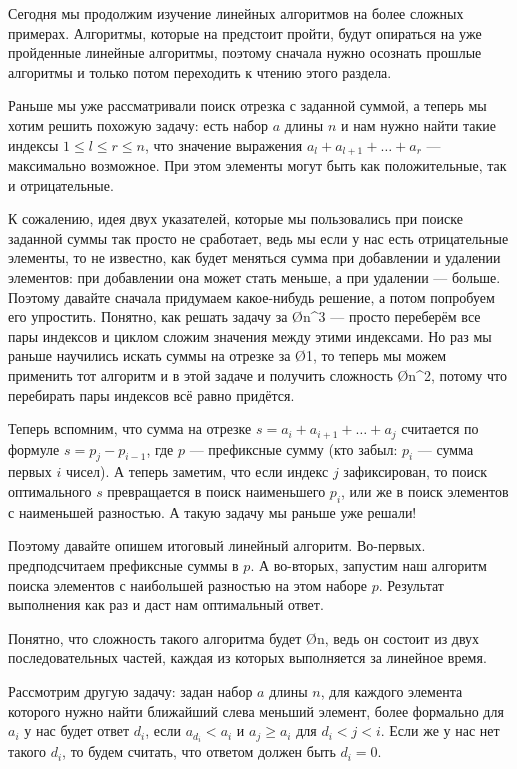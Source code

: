 Сегодня мы продолжим изучение линейных алгоритмов на более сложных примерах. Алгоритмы, которые на предстоит пройти, будут опираться на уже пройденные линейные алгоритмы, поэтому сначала нужно осознать прошлые алгоритмы и только потом переходить к чтению этого раздела.


Раньше мы уже рассматривали поиск отрезка с заданной суммой, а теперь мы хотим решить похожую задачу: есть набор $a$ длины $n$ и нам нужно найти такие индексы $1 \leq l \leq r \leq n$, что значение выражения $a_l + a_{l + 1} + \ldots + a_r$ — максимально возможное. При этом элементы могут быть как положительные, так и отрицательные. 

К сожалению, идея двух указателей, которые мы пользовались при поиске заданной суммы так просто не сработает, ведь мы если у нас есть отрицательные элементы, то не известно, как будет меняться сумма при добавлении и удалении элементов: при добавлении она может стать меньше, а при удалении — больше. Поэтому давайте сначала придумаем какое-нибудь решение, а потом попробуем его упростить. Понятно, как решать задачу за \O{n^3} — просто переберём все пары индексов и циклом сложим значения между этими индексами. Но раз мы раньше научились искать суммы на отрезке за \O{1}, то теперь мы можем применить тот алгоритм и в этой задаче и получить сложность \O{n^2}, потому что перебирать пары индексов всё равно придётся.

Теперь вспомним, что сумма на отрезке $s = a_i + a_{i + 1} + \ldots + a_j$ считается по формуле $s = p_j - p_{i - 1}$, где $p$ — префиксные сумму (кто забыл: $p_i$ — сумма первых $i$ чисел). А теперь заметим, что если индекс $j$ зафиксирован, то поиск оптимального $s$ превращается в поиск наименьшего $p_i$, или же в поиск элементов с наименьшей разностью. А такую задачу мы раньше уже решали!

Поэтому давайте опишем итоговый линейный алгоритм. Во-первых. предподсчитаем префиксные суммы в $p$. А во-вторых, запустим наш алгоритм поиска элементов с наибольшей разностью на этом наборе $p$. Результат выполнения как раз и даст нам оптимальный ответ.

Понятно, что сложность такого алгоритма будет \O{n}, ведь он состоит из двух последовательных частей, каждая из которых выполняется за линейное время.


Рассмотрим другую задачу: задан набор $a$ длины $n$, для каждого элемента которого нужно найти ближайший слева меньший элемент, более формально для $a_i$ у нас будет ответ $d_i$, если $a_{d_i} < a_i$ и $a_j \geq a_i$ для $d_i < j < i$. Если же у нас нет такого $d_i$, то будем считать, что ответом должен быть $d_i = 0$.

